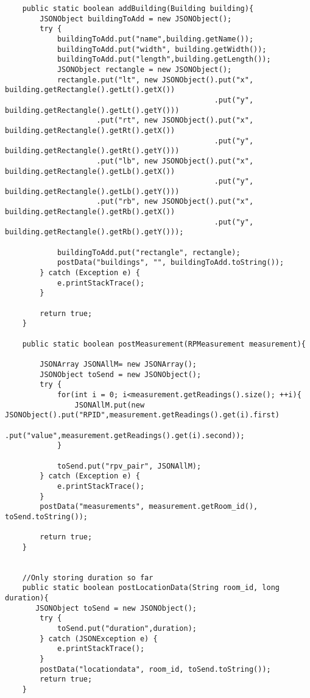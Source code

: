 \begin{lstlisting}
    public static boolean addBuilding(Building building){
        JSONObject buildingToAdd = new JSONObject();
        try {
            buildingToAdd.put("name",building.getName());
            buildingToAdd.put("width", building.getWidth());
            buildingToAdd.put("length",building.getLength());
            JSONObject rectangle = new JSONObject();
            rectangle.put("lt", new JSONObject().put("x", building.getRectangle().getLt().getX())
                                                .put("y", building.getRectangle().getLt().getY()))
                     .put("rt", new JSONObject().put("x", building.getRectangle().getRt().getX())
                                                .put("y", building.getRectangle().getRt().getY()))
                     .put("lb", new JSONObject().put("x", building.getRectangle().getLb().getX())
                                                .put("y", building.getRectangle().getLb().getY()))
                     .put("rb", new JSONObject().put("x", building.getRectangle().getRb().getX())
                                                .put("y", building.getRectangle().getRb().getY()));

            buildingToAdd.put("rectangle", rectangle);
            postData("buildings", "", buildingToAdd.toString());
        } catch (Exception e) {
            e.printStackTrace();
        }

        return true;
    }

    public static boolean postMeasurement(RPMeasurement measurement){

        JSONArray JSONAllM= new JSONArray();
        JSONObject toSend = new JSONObject();
        try {
            for(int i = 0; i<measurement.getReadings().size(); ++i){
                JSONAllM.put(new JSONObject().put("RPID",measurement.getReadings().get(i).first)
                        .put("value",measurement.getReadings().get(i).second));
            }

            toSend.put("rpv_pair", JSONAllM);
        } catch (Exception e) {
            e.printStackTrace();
        }
        postData("measurements", measurement.getRoom_id(), toSend.toString());

        return true;
    }


    //Only storing duration so far
    public static boolean postLocationData(String room_id, long duration){
       JSONObject toSend = new JSONObject();
        try {
            toSend.put("duration",duration);
        } catch (JSONException e) {
            e.printStackTrace();
        }
        postData("locationdata", room_id, toSend.toString());
        return true;
    }


\end{lstlisting}
